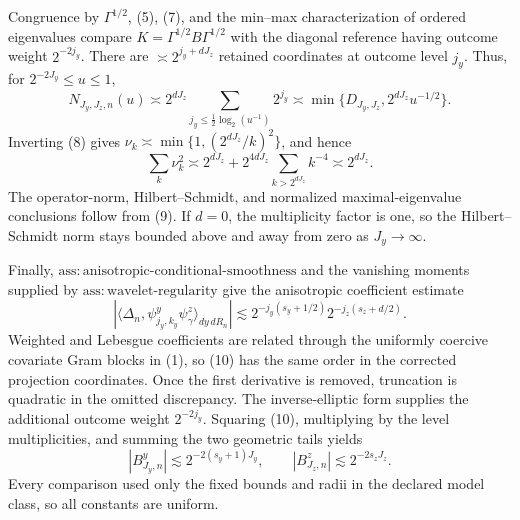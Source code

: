 Congruence by \(\Gamma^{1/2}\), (5), (7), and the min--max characterization of ordered eigenvalues compare \(K=\Gamma^{1/2}B\Gamma^{1/2}\) with the diagonal reference having outcome weight \(2^{-2j_y}\).  There are \(\asymp2^{j_y+dJ_z}\) retained coordinates at outcome level \(j_y\).  Thus, for \(2^{-2J_y}\le u\le1\),
\[
N_{J_y,J_z,n}(u)
\asymp2^{dJ_z}\sum_{j_y\le\frac12\log_2(u^{-1})}2^{j_y}
\asymp\min\{D_{J_y,J_z},2^{dJ_z}u^{-1/2}\}.                              \tag{8}
\]
Inverting (8) gives \(\nu_k\asymp\min\{1,(2^{dJ_z}/k)^2\}\), and hence
\[
\sum_k\nu_k^2
\asymp2^{dJ_z}+2^{4dJ_z}\sum_{k>2^{dJ_z}}k^{-4}
\asymp2^{dJ_z}.                                                           \tag{9}
\]
The operator-norm, Hilbert--Schmidt, and normalized maximal-eigenvalue conclusions follow from (9).  If \(d=0\), the multiplicity factor is one, so the Hilbert--Schmidt norm stays bounded above and away from zero as \(J_y\to\infty\).

Finally, \(\mathrm{ass{:}anisotropic\text{-}conditional\text{-}smoothness}\) and the vanishing moments supplied by \(\mathrm{ass{:}wavelet\text{-}regularity}\) give the anisotropic coefficient estimate
\[
|\langle\Delta_n,\psi^y_{j_y,k_y}\psi^z_\gamma\rangle_{dy\,dR_n}|
\lesssim2^{-j_y(s_y+1/2)}2^{-j_z(s_z+d/2)}.                               \tag{10}
\]
Weighted and Lebesgue coefficients are related through the uniformly coercive covariate Gram blocks in (1), so (10) has the same order in the corrected projection coordinates.  Once the first derivative is removed, truncation is quadratic in the omitted discrepancy.  The inverse-elliptic form supplies the additional outcome weight \(2^{-2j_y}\).  Squaring (10), multiplying by the level multiplicities, and summing the two geometric tails yields
\[
|B^y_{J_y,n}|\lesssim2^{-2(s_y+1)J_y},
\qquad
|B^z_{J_z,n}|\lesssim2^{-2s_zJ_z}.
\]
Every comparison used only the fixed bounds and radii in the declared model class, so all constants are uniform.